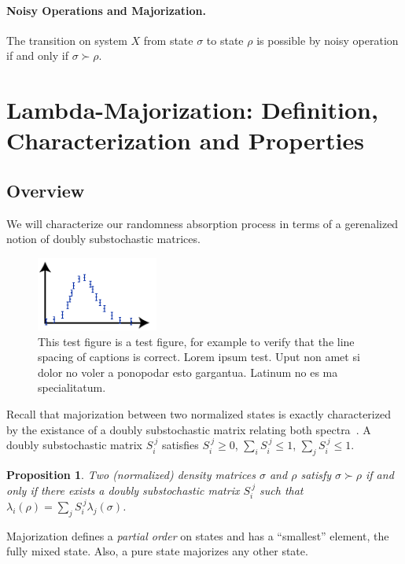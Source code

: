 \documentclass[11pt,a4paper]{article}
\theoremstyle{plain}
\newtheorem{prop}[thm]{Proposition}
\begin{document}
\paragraph{Noisy Operations and Majorization.}
The transition on system $X$ from state $\sigma$ to state $\rho$ is possible by noisy operation if and
only if $\sigma\succ\rho$.


\section{Lambda-Majorization: Definition, Characterization and Properties}

\subsection{Overview}
We will characterize our randomness absorption process in terms of a gerenalized notion of doubly
substochastic matrices.

\begin{figure}
  \centering
  \includegraphics[width=4cm]{testfigure}
  \caption{This test figure is a test figure, for example to verify that the line spacing
    of captions is correct. Lorem ipsum test.  Uput non amet si dolor no voler a ponopodar
    esto gargantua.  Latinum no es ma specialitatum.}
  \label{fig:test-2}
\end{figure}

Recall that majorization between two normalized states is exactly characterized by the existance of
a doubly substochastic matrix relating both spectra~\cite{BookBhatiaMatrixAnalysis1997}. A doubly
substochastic matrix $S_i^{~j}$ satisfies
$S_i^{~j}\geqslant 0$, $\sum_i S_i^{~j} \leqslant 1$, $\sum_j S_i^{~j} \leqslant 1$.
\begin{prop}
  \label{prop:majorizationDoublyStochMatrix}
  Two (normalized) density matrices $\sigma$ and $\rho$ satisfy $\sigma\succ\rho$ if and only if
  there exists a doubly substochastic matrix $S_i^{~j}$ such that
  $\lambda_i(\rho) = \sum_j S_i^{~j}\lambda_j(\sigma)$.
\end{prop}

Majorization defines a {\em partial order} on states and has a ``smallest'' element, the fully mixed state. Also,
a pure state majorizes any other state.
\end{document}
